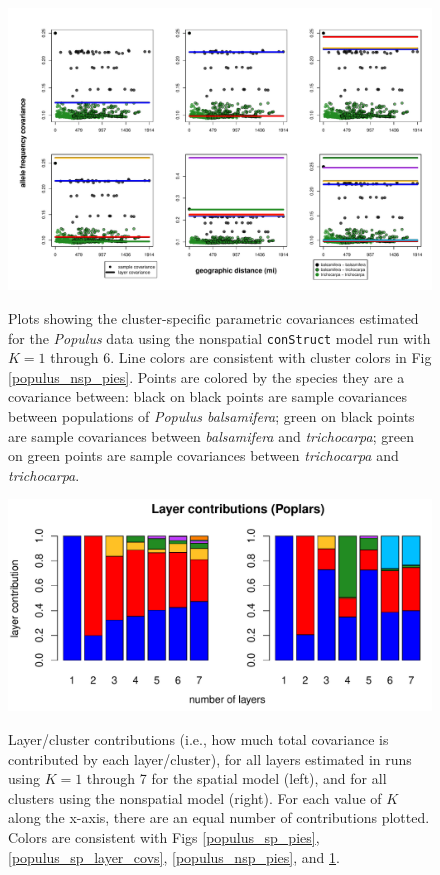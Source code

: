 \documentclass[10pt,letterpaper]{article}
\newcommand{\tri}{\textit{trichocarpa}}
\newcommand{\bals}{\textit{balsamifera}}
\begin{document}
\begin{figure}
	\centering
		{\includegraphics[width=\textwidth]{figs/populus/populus_nsp_layer_covs.pdf}}
	\caption{
	Plots showing the cluster-specific parametric covariances 
	estimated for the \textit{Populus} data using 
	the nonspatial \texttt{conStruct} model run with $K=1$ through 6.
	Line colors are consistent with cluster colors in Fig \ref{populus_nsp_pies}.
	Points are colored by the species they are a covariance between:
	black on black points are sample covariances between populations of \textit{Populus balsamifera};
	green on black points are sample covariances between \bals{} and \tri{};
	green on green points are sample covariances between \tri{} and \tri{}.
    }\label{populus_nsp_layer_covs}
\end{figure}
\clearpage

\begin{figure}
	\centering
		{\includegraphics[width=\textwidth]{figs/populus/populus_laycon_barplots.pdf}}
	\caption{
	Layer/cluster contributions (i.e., how much total covariance is contributed by each layer/cluster), 
	for all layers estimated in runs using $K = 1$ through 7 
	for the spatial model (left), 
	and for all clusters using the nonspatial model (right).
	For each value of $K$ along the x-axis, there are an equal number of contributions plotted.
	Colors are consistent with Figs \ref{populus_sp_pies}, \ref{populus_sp_layer_covs}, \ref{populus_nsp_pies}, and \ref{populus_nsp_layer_covs}.
    }\label{populus_laycon}
\end{figure}
\clearpage
\end{document}
